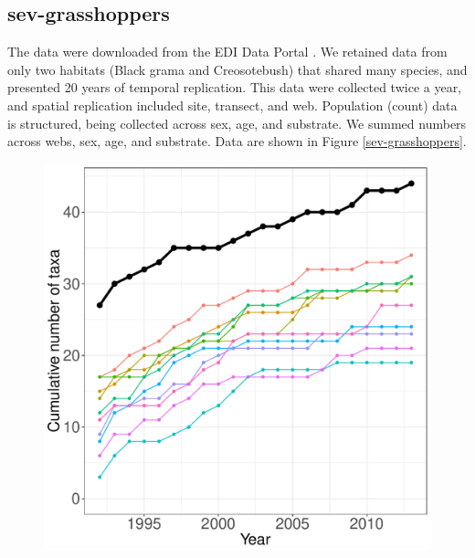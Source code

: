 \documentclass[11pt, oneside]{article}
\begin{document}
\subsection {sev-grasshoppers}
The data were downloaded from the EDI Data Portal \citep{sev-grasshopper}.
We retained data from only two habitats (Black grama and Creosotebush) that shared many species, and presented 20 years of temporal replication. This data were collected twice a year, and spatial replication included site, transect, and web. 
Population (count) data is structured, being collected across sex, age, and substrate. 
We summed numbers across webs, sex, age, and substrate.
Data are shown in Figure \ref{sev-grasshoppers}.
  

\begin{figure}[h!]
\centering
\includegraphics[scale = 0.4]{sev-grasshopper-compagnoni_species_accumulation_curve.pdf}

\end{figure}
\end{document}

